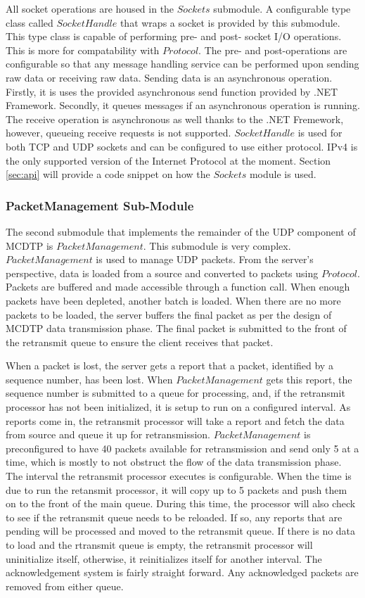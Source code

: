 All socket operations are housed in the $Sockets$ submodule. A configurable type class called $SocketHandle$ that wraps a socket is provided by this submodule. This type class is capable of performing pre- and post- socket I/O operations. This is more for compatability with $Protocol$. The pre- and post-operations are configurable so that any message handling service can be performed upon sending raw data or receiving raw data. Sending data is an asynchronous operation. Firstly, it is uses the provided asynchronous send function provided by .NET Framework. Secondly, it queues messages if an asynchronous operation is running. The receive operation is asynchronous as well thanks to the .NET Fremework, however, queueing receive requests is not supported. $SocketHandle$ is used for both TCP and UDP sockets and can be configured to use either protocol. IPv4 is the only supported version of the Internet Protocol at the moment. Section \ref{sec:api} will provide a code snippet on how the $Sockets$ module is used.

\subsubsection{PacketManagement Sub-Module}

The second submodule that implements the remainder of the UDP component of MCDTP is $PacketManagement$. This submodule is very complex. $PacketManagement$ is used to manage UDP packets. From the server's perspective, data is loaded from a source and converted to packets using $Protocol$. Packets are buffered and made accessible through a function call. When enough packets have been depleted, another batch is loaded. When there are no more packets to be loaded, the server buffers the final packet as per the design of MCDTP data transmission phase. The final packet is submitted to the front of the retransmit queue to ensure the client receives that packet.

When a packet is lost, the server gets a report that a packet, identified by a sequence number, has been lost. When $PacketManagement$ gets this report, the sequence number is submitted to a queue for processing, and, if the retransmit processor has not been initialized, it is setup to run on a configured interval. As reports come in, the retransmit processor will take a report and fetch the data from source and queue it up for retransmission. $PacketManagement$ is preconfigured to have 40 packets available for retransmission and send only 5 at a time, which is mostly to not obstruct the flow of the data transmission phase. The interval the retransmit processor executes is configurable. When the time is due to run the retansmit processor, it will copy up to 5 packets and push them on to the front of the main queue. During this time, the processor will also check to see if the retransmit queue needs to be reloaded. If so, any reports that are pending will be processed and moved to the retransmit queue. If there is no data to load and the rtransmit queue is empty, the retransmit processor will uninitialize itself, otherwise, it reinitializes itself for another interval. The acknowledgement system is fairly straight forward. Any acknowledged packets are removed from either queue.

